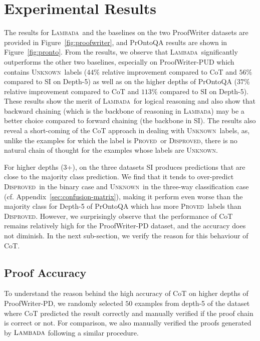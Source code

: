 \documentclass[11pt]{article}
\newcommand{\algo}{\textsc{Lambada}}
\newcommand{\proved}{\textsc{Proved}}
\newcommand{\disproved}{\textsc{Disproved}}
\newcommand{\unk}{\textsc{Unknown}}
\begin{document}
\section{Experimental Results}
The results for \algo\ and the baselines on the two ProofWriter datasets are provided in Figure~\ref{fig:proofwriter}, and PrOntoQA results are shown in Figure~\ref{fig:pronto}. From the results, we observe that \algo\ significantly outperforms the other two baselines, especially on ProofWriter-PUD which contains \unk\ labels ($44\%$ relative improvement compared to CoT and $56\%$ compared to SI on Depth-5) as well as on the higher depths of PrOntoQA ($37\%$ relative improvement compared to CoT and $113\%$ compared to SI on Depth-5). These results show the merit of \algo\ for logical reasoning and also show that backward chaining (which is the backbone of reasoning in \algo) may be a better choice compared to forward chaining (the backbone in SI). The results also reveal a short-coming of the CoT approach in dealing with \unk\ labels, as, unlike the examples for which the label is \proved\ or \disproved, there is no natural chain of thought for the examples whose labels are \unk.

For higher depths (3+), on the three datasets SI produces predictions that are close to the majority class prediction. We find that it tends to over-predict \disproved\ in the binary case and \unk\ in the three-way classification case (cf. Appendix~\ref{sec:confusion-matrix}), making it perform even worse than the majority class for Depth-5 of PrOntoQA which has more \proved\ labels than \disproved. However, we surprisingly observe that the performance of CoT remains relatively high for the ProofWriter-PD dataset, and the accuracy does not diminish. In the next sub-section, we verify the reason for this behaviour of CoT. 

\subsection{Proof Accuracy}
To understand the reason behind the high accuracy of CoT on higher depths of ProofWriter-PD, we randomly selected $50$ examples from depth-5 of the dataset where CoT predicted the result correctly and manually verified if the proof chain is correct or not. For comparison, we also manually verified the proofs generated by $\algo$ following a similar procedure. 
\end{document}
